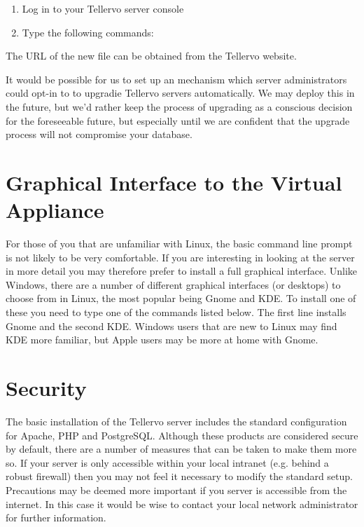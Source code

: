 \begin{enumerate}
 \item Log in to your Tellervo server console 
 \item Type the following commands: 
\end{enumerate}

The URL of the new file can be obtained from the Tellervo website.  

It would be possible for us to set up an mechanism which server administrators could opt-in to to upgradie Tellervo servers automatically.  We may deploy this in the future, but we'd rather keep the process of upgrading as a conscious decision for the foreseeable future, but especially until we are confident that the upgrade process will not compromise your database.


\section{Graphical Interface to the Virtual Appliance}
For those of you that are unfamiliar with Linux, the basic command line prompt is not likely to be very comfortable.  If you are interesting in looking at the server in more detail you may therefore prefer to install a full graphical interface.  Unlike Windows, there are a number of different graphical interfaces (or desktops) to choose from in Linux, the most popular being Gnome and KDE.  To install one of these you need to type one of the commands listed below.  The first line installs Gnome and the second KDE. Windows users that are new to Linux may find KDE more familiar, but Apple users may be more at home with Gnome.


\section{Security}
The basic installation of the Tellervo server includes the standard configuration for Apache, PHP and PostgreSQL.  Although these products are considered secure by default, there are a number of measures that can be taken to make them more so.  If your server is only accessible within your local intranet (e.g. behind a robust firewall) then you may not feel it necessary to modify the standard setup.  Precautions may be deemed more important if you server is accessible from the internet.  In this case it would be wise to contact your local network administrator for further information.

